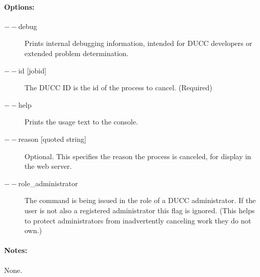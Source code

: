     \paragraph{Options:}
    \begin{description}
        \item[$--$debug ]          
          Prints internal debugging information, intended for DUCC developers or extended problem determination.          
        \item[$--$id {[jobid]}]
          The DUCC ID is the id of the process to cancel. (Required)
        \item[$--$help]
          Prints the usage text to the console.
        \item[$--$reason {[quoted string]}]
          Optional. This specifies the reason the process is canceled, for display in the web server. 
        \item[$--$role\_administrator] The command is being issued in the role of a DUCC administrator.
          If the user is not also a registered administrator this flag is ignored.  (This helps to
          protect administrators from inadvertently canceling work they do not own.)
     \end{description}
        
    \paragraph{Notes:}
    None.

